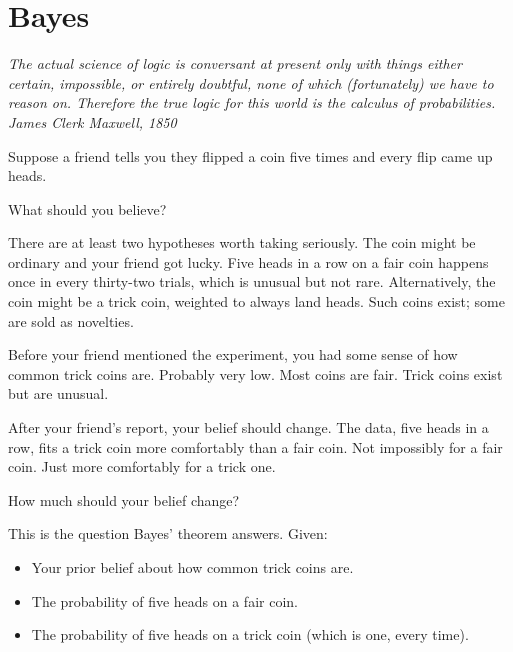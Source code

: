 \chapter{Bayes}

\vspace{1em}
\hfill
\begin{minipage}[c]{0.55\textwidth}
\raggedleft
\small\itshape
The actual science of logic is conversant at present only with things either certain, impossible, or entirely doubtful, none of which (fortunately) we have to reason on. Therefore the true logic for this world is the calculus of probabilities.\\[0.5em]
\upshape\footnotesize James Clerk Maxwell, 1850
\end{minipage}%
\hspace{0.5em}
\begin{minipage}[c]{0.12\textwidth}
\end{minipage}
\vspace{1.5em}

\noindent Suppose a friend tells you they flipped a coin five times and every flip came up heads.

What should you believe?

There are at least two hypotheses worth taking seriously. The coin might be ordinary and your friend got lucky. Five heads in a row on a fair coin happens once in every thirty-two trials, which is unusual but not rare. Alternatively, the coin might be a trick coin, weighted to always land heads. Such coins exist; some are sold as novelties.

Before your friend mentioned the experiment, you had some sense of how common trick coins are. Probably very low. Most coins are fair. Trick coins exist but are unusual.

After your friend's report, your belief should change. The data, five heads in a row, fits a trick coin more comfortably than a fair coin. Not impossibly for a fair coin. Just more comfortably for a trick one.

How much should your belief change?

This is the question Bayes' theorem answers. Given:

\begin{itemize}
\item Your prior belief about how common trick coins are.
\item The probability of five heads on a fair coin.
\item The probability of five heads on a trick coin (which is one, every time).
\end{itemize}

